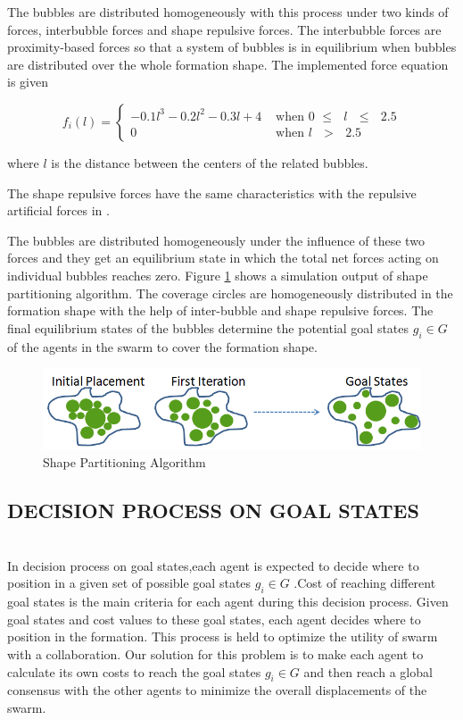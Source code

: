 \documentclass[letterpaper, 10 pt, conference]{ieeeconf}  %
\begin{document}
The bubbles are distributed homogeneously with this process under two kinds of forces, interbubble forces and shape repulsive forces. The interbubble forces are proximity-based forces so that a system of bubbles is in equilibrium when bubbles are distributed over the whole formation shape. The implemented force equation is given
		
\begin{equation}
f_i(l) = \left\{ \begin{array}{rl}
-0.1l^3 - 0.2l^2 - 0.3l + 4 &\mbox{ when 0 $\leq$ $l$ $\leq$ $2.5$} \\
0                               &\mbox{ when $l$ $>$ $2.5$}
\end{array} \right.
\end{equation}

where $l$ is the distance between the centers of the related bubbles. 
   	
The shape repulsive forces have the same characteristics with the repulsive artificial forces in \cite{17}.
	
The bubbles are distributed homogeneously under the influence of these two forces and they get an equilibrium state in which the total net forces acting on individual bubbles reaches zero. Figure \ref{buble_ornek} shows a simulation output of shape partitioning algorithm. The coverage circles are homogeneously distributed in the formation shape with the help of inter-bubble and shape repulsive forces. The final equilibrium states of the bubbles determine the potential goal states $g_i \in G$  of the agents in the swarm to cover the formation shape.

\begin{figure}[thpb]
      \centering     
      \includegraphics[scale = 0.35]{bubble_packing2}
    \caption{Shape Partitioning Algorithm} \label{buble_ornek}
\end{figure} 
	
\subsection{DECISION PROCESS ON GOAL STATES}\hspace{0pt} \label{DecisionProcess Ref} \\
In decision process on goal states,each agent is expected to decide where to position in a given set of possible goal states $g_i \in G$ .Cost of reaching different goal states is the main criteria for each agent during this decision process. Given goal states and cost values to these goal states, each agent decides where to position in the formation. This process is held to optimize the utility of swarm with a collaboration. Our solution for this problem is to make each agent to calculate its own costs to reach the goal states $g_i \in G$ and then reach a global consensus with the other agents to minimize the overall displacements of the swarm. 
\end{document}
